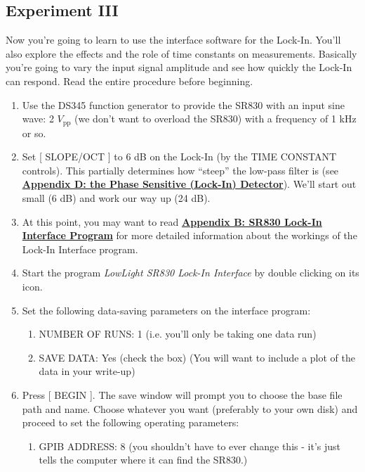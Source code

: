 \documentclass{../lab}
\begin{document}
\subsection{Experiment III}

Now you're going to learn to use the interface software for the Lock-In. You'll also explore the effects and the role of time constants on measurements. Basically you're going to vary the input signal amplitude and see how quickly the Lock-In can respond. Read the entire procedure before beginning.

\begin{enumerate}
    \item Use the DS345 function generator to provide the SR830 with an input sine wave: 2 $V_\text{pp}$ (we don't want to overload the SR830) with a frequency of 1 kHz or so.

    \item Set [ SLOPE/OCT ] to 6 dB on the Lock-In (by the TIME CONSTANT controls). This partially determines how ``steep'' the low-pass filter is (see \href{http://experimentationlab.berkeley.edu/node/99}{\textbf{Appendix D: the Phase Sensitive (Lock-In) Detector}}). We'll start out small (6 dB) and work our way up (24 dB).

    \item At this point, you may want to read \href{http://experimentationlab.berkeley.edu/node/97}{\textbf{Appendix B: SR830 Lock-In Interface Program}} for more detailed information about the workings of the Lock-In Interface program.

    \item Start the program \emph{LowLight SR830 Lock-In Interface} by double clicking on its icon.

    \item Set the following data-saving parameters on the interface program:
    \begin{enumerate}
        \item NUMBER OF RUNS: 1 (i.e. you'll only be taking one data run)

        \item SAVE DATA: Yes (check the box) (You will want to include a plot of the data in your write-up)

    \end{enumerate}

    \item Press [ BEGIN ]. The save window will prompt you to choose the base file path and name. Choose whatever you want (preferably to your own disk) and proceed to set the following operating parameters:
    \begin{enumerate}
        \item GPIB ADDRESS: 8 (you shouldn't have to ever change this - it's just tells the computer where it can find the SR830.)


\end{enumerate}
\end{enumerate}
\end{document}
